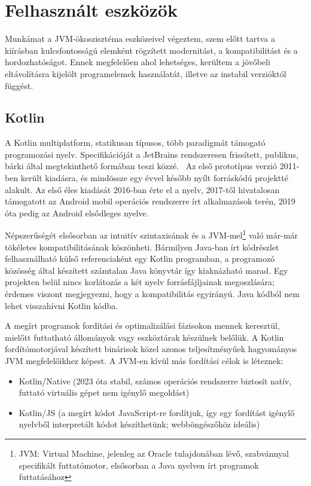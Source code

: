 \chapter{Felhasznált eszközök}
\label{sec:LatexTools}

Munkámat a JVM-ökoszisztéma eszközeivel végeztem, szem előtt tartva a kiírásban kulcsfontosságú elemként rögzített modernitást, a kompatibilitást és a hordozhatóságot. Ennek megfelelően ahol lehetséges, kerültem a jövőbeli eltávolításra kijelölt programelemek használatát, illetve az instabil verzióktól függést.


\section{Kotlin }

A Kotlin multiplatform, statikusan típusos, több paradigmát támogató programozási nyelv. Specifikációját a JetBrains rendszeresen frissített, publikus, bárki által megtekinthető formában teszi közzé.~\cite{KotlinSpec} Az első prototípus verzió 2011-ben került kiadásra, és mindössze egy évvel később nyílt forráskódú projektté alakult. Az első éles kiadását 2016-ban érte el a nyelv, 2017-től hivatalosan támogatott az Android mobil operációs rendszerre írt alkalmazások terén, 2019 óta pedig az Android elsődleges nyelve.~\cite{KotlinPast}

Népszerűségét elsősorban az intuitív szintaxisának és a JVM-mel\footnote{JVM: \@Java Virtual Machine, jelenleg az Oracle tulajdonában lévő, szabvánnyal specifikált futtatómotor, elsősorban a Java nyelven írt programok futtatásához } való már-már tökéletes kompatibilitásának köszönheti. Bármilyen Java-ban írt kódrészlet felhasználható külső referenciaként egy Kotlin programban, a programozó közösség által készített számtalan Java könyvtár így kiaknázható marad.  Egy projekten belül nincs korlátozás a két nyelv forrásfájljainak megoszlására; érdemes viszont megjegyezni, hogy a kompatibilitás egyirányú. Java kódból nem lehet visszahívni Kotlin kódba.

A megírt programok fordítási és optimalizálási fázisokon mennek keresztül, mielőtt futtatható állományok vagy eszköztárak készülnek belőlük. A Kotlin fordítómotorjával készített binárisok közel azonos teljesítményűek hagyományos JVM megfelelőikhez képest. A JVM-en kívül más fordítási célok is léteznek:
\begin{itemize}
    \item Kotlin/Native (2023 óta stabil, számos operációs rendszerre biztosít natív, futtató virtuális gépet nem igénylő megoldást)
    \item Kotlin/JS (a megírt kódot JavaScript-re fordítjuk, így egy fordítást igénylő nyelvből interpretált kódot készíthetünk; webböngészőhöz ideális)
\end{itemize}

